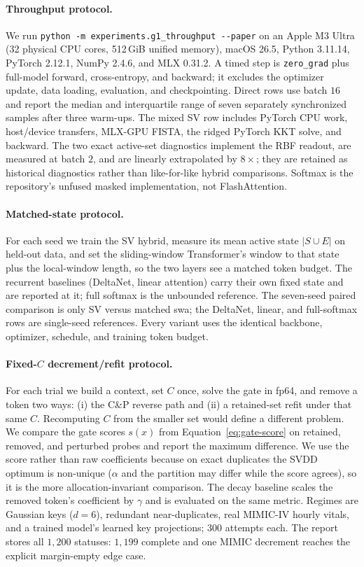 \paragraph{Throughput protocol.} We run
\verb|python -m experiments.g1_throughput --paper| on an Apple M3 Ultra
(32 physical CPU cores, 512\,GiB unified memory), macOS 26.5, Python 3.11.14,
PyTorch 2.12.1, NumPy 2.4.6, and MLX 0.31.2. A timed step is
\texttt{zero\_grad} plus full-model forward, cross-entropy, and backward; it excludes
the optimizer update, data loading, evaluation, and checkpointing. Direct rows use
batch $16$ and report the median and interquartile range of seven separately
synchronized samples after three warm-ups. The mixed SV row includes PyTorch CPU
work, host/device transfers, MLX-GPU FISTA, the ridged PyTorch KKT solve, and
backward. The two exact active-set diagnostics implement the RBF readout, are
measured at batch $2$, and are linearly extrapolated by $8\times$; they are retained
as historical diagnostics rather than like-for-like hybrid comparisons. Softmax is
the repository's unfused masked implementation, not FlashAttention.

\paragraph{Matched-state protocol.} For each seed we train the SV hybrid, measure its mean
active state $|S \cup E|$ on held-out data, and set the sliding-window Transformer's window to
that state plus the local-window length, so the two layers see a matched token budget. The
recurrent baselines (DeltaNet, linear attention) carry their own fixed state and are reported
at it; full softmax is the unbounded reference. The seven-seed paired comparison is only
SV versus matched swa; the DeltaNet, linear, and full-softmax rows are single-seed
references. Every variant uses the identical backbone, optimizer, schedule, and training
token budget.

\paragraph{Fixed-\(C\) decrement/refit protocol.} For each trial we build a
context, set \(C\) once, solve the gate in fp64, and remove a token two ways:
(i) the C\&P reverse path and (ii) a retained-set refit under that same \(C\).
Recomputing \(C\) from the smaller set would define a different problem. We
compare the gate scores \(s(x)\) from Equation~\ref{eq:gate-score} on retained,
removed, and perturbed probes and report the maximum difference. We use the
score rather than raw coefficients because on exact duplicates the SVDD optimum
is non-unique (\(\alpha\) and the partition may differ while the score agrees),
so it is the more allocation-invariant comparison. The decay baseline scales
the removed token's coefficient by \(\gamma\) and
is evaluated on the same metric. Regimes are Gaussian keys (\(d=6\)),
redundant near-duplicates, real MIMIC-IV hourly vitals, and a trained model's
learned key projections; \(300\) attempts each. The report stores all
\(1{,}200\) statuses: \(1{,}199\) complete and one MIMIC decrement reaches the
explicit margin-empty edge case.

